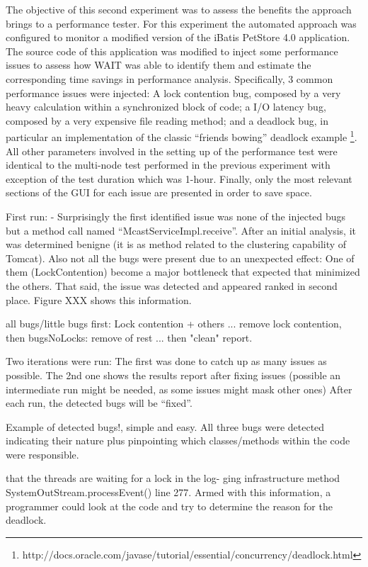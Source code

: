 \documentclass[runningheads,a4paper]{llncs}
\begin{document}
The objective of this second experiment was to assess the benefits the approach
brings to a performance tester. For this experiment the automated approach was
configured to monitor a modified version of the iBatis PetStore 4.0 application.
The source code of this application was modified to inject some performance
issues to assess how WAIT was able to identify them and estimate the corresponding 
time savings in performance analysis. Specifically, 3 common performance issues were 
injected: A lock contention bug, composed by a very heavy calculation within a
synchronized block of code; a I/O latency bug, composed by a very expensive file reading 
method; and a deadlock bug, in particular an implementation of the classic
``friends bowing'' deadlock example
\footnote{http://docs.oracle.com/javase/tutorial/essential/concurrency/deadlock.html}.
All other parameters involved in the setting up of the performance test were
identical to the multi-node test performed in the previous experiment with
exception of the test duration which was 1-hour. Finally, only the most relevant
sections of the GUI for each issue are presented in order to save space.

First run:
- Surprisingly the first identified issue was none of the injected bugs but a
method call named ``McastServiceImpl.receive''. After an initial analysis, it
was determined benigne (it is as method related to the clustering capability of
Tomcat). Also not all the bugs were present due to an unexpected effect: One of them
(LockContention) become a major bottleneck that expected that minimized the
others. That said, the issue was detected and appeared ranked in second place.
Figure XXX shows this information.


all bugs/little bugs first: Lock contention + others ...
remove lock contention, then bugsNoLocks: remove of rest ...
then "clean" report.

Two iterations were run: The first was done to catch up as many issues as
possible. The 2nd one shows the results report after fixing issues (possible an
intermediate run might be needed, as some issues might mask other ones) After each run, 
the detected bugs will be “fixed”.

Example of detected bugs!, simple and easy. All three bugs were
detected indicating their nature plus pinpointing which classes/methods within
the code were responsible.

that the threads are waiting for a lock in the log- ging infrastructure method SystemOutStream.processEvent() line 277. 
Armed with this information, a programmer could look at the code and try to determine the reason for the deadlock.
\end{document}
